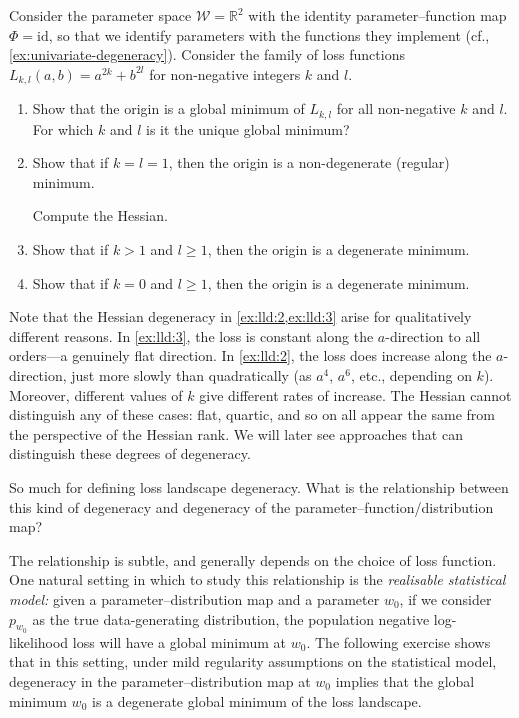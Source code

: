 \documentclass[11pt]{article}
\newcommand{\R}{\mathbb{R}}
\newcommand{\W}{\mathcal{W}}
\begin{document}
\begin{exercise}
\label{ex:loss-landscape-degeneracy}
    Consider the parameter space $\W = \R^2$ with the identity
    parameter--function map $\Phi = \mathrm{id}$, so that we identify
    parameters with the functions they implement
    (cf., \cref{ex:univariate-degeneracy}).
    Consider the family of loss functions
        $L_{k,l}(a,b) = a^{2k} + b^{2l}$
    for non-negative integers $k$ and $l$.
\begin{enumerate}
    \item
        Show that the origin is a global minimum of $L_{k,l}$ for all
        non-negative $k$ and $l$. For which $k$ and $l$ is it the unique global
        minimum?
    \item
        \label{ex:lld:1}
        Show that if $k = l = 1$, then the origin is a non-degenerate
        (regular) minimum.
        \begin{hint}
Compute the Hessian.
        \end{hint}
    \item
        \label{ex:lld:2}
        Show that if $k > 1$ and $l \geq 1$, then the origin is a
        degenerate minimum.
    \item
        \label{ex:lld:3}
        Show that if $k = 0$ and $l \geq 1$, then the origin is a
        degenerate minimum.
\end{enumerate}
\end{exercise}

Note that the Hessian degeneracy in \cref{ex:lld:2,ex:lld:3} arise for
qualitatively different reasons. In \cref{ex:lld:3}, the loss is constant along
the $a$-direction to all orders---a genuinely flat direction. In
\cref{ex:lld:2}, the loss does increase along the $a$-direction, just more
slowly than quadratically (as $a^4$, $a^6$, etc., depending on $k$). Moreover,
different values of $k$ give different rates of increase. The Hessian cannot
distinguish any of these cases: flat, quartic, and so on all appear the same
from the perspective of the Hessian rank. We will later see approaches that can
distinguish these degrees of degeneracy.

So much for defining loss landscape degeneracy. What is the relationship
between this kind of degeneracy and degeneracy of the
parameter--function/distribution map?

The relationship is subtle, and generally depends on the choice of loss
function. One natural setting in which to study this relationship is the
\emph{realisable statistical model:} given a parameter--distribution map and a
parameter $w_0$, if we consider $p_{w_0}$ as the true data-generating
distribution, the population negative log-likelihood loss will have a global
minimum at $w_0$. The following exercise shows that in this setting, under mild
regularity assumptions on the statistical model, degeneracy in the
parameter--distribution map at $w_0$ implies that the global minimum $w_0$ is a
degenerate global minimum of the loss landscape.
\end{document}
